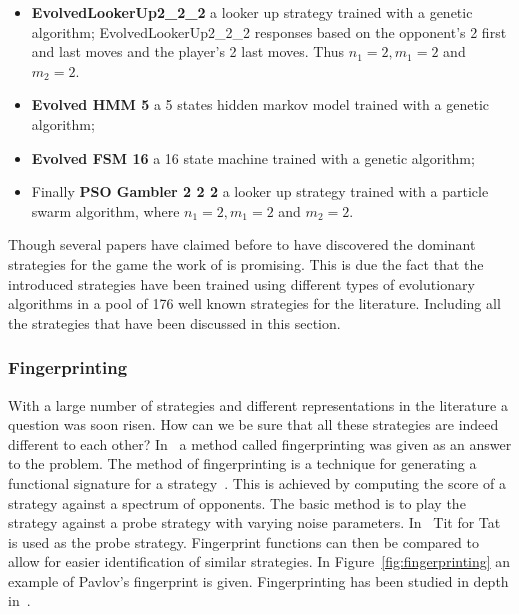 \documentclass{article}
\begin{document}
\begin{itemize}
    \item \textbf{EvolvedLookerUp2\_2\_2} a looker up strategy trained with a
    genetic algorithm; EvolvedLookerUp2\_2\_2 responses based on the opponent's 
    2 first and last moves and the player's 2 last moves. Thus \(n_1=2, m_1=2\)
    and \(m_2=2\). 
    \item \textbf{Evolved HMM 5} a 5 states hidden markov model trained with a genetic 
    algorithm;
    \item \textbf{Evolved FSM 16} a 16 state machine trained with a genetic
    algorithm; 
    \item Finally \textbf{PSO Gambler 2 2 2} a looker up strategy trained with
    a particle swarm algorithm, where \(n_1=2, m_1=2\) and \(m_2=2\).
\end{itemize}

Though several papers have claimed before to have discovered the dominant
strategies for the game the work of \cite{Knight2017} is promising. 
This is due the fact that the introduced strategies have been trained using
different types of evolutionary algorithms in a pool of 176 well known 
strategies for the literature. Including all the strategies that have been 
discussed in this section.

\subsubsection{Fingerprinting}

With a large number of strategies and different representations in the literature
a question was soon risen. How can we be sure that all these strategies are 
indeed different to each other? In~\cite{Ashlock2005} a method called 
fingerprinting was given as an answer to the problem. The method of 
fingerprinting is a technique for generating a functional signature for a 
strategy~\cite{Ashlock2008}. This is achieved by computing the score of a strategy
against a spectrum of opponents. The basic method is to play the strategy
against a probe strategy with varying noise parameters. In~\cite{Ashlock2005} 
Tit for Tat is used as the probe strategy. Fingerprint functions
can then be compared to allow for easier identification of similar strategies.
In Figure~\ref{fig:fingerprinting} an example of Pavlov's fingerprint is given.
Fingerprinting has been studied in depth in~\cite{Ashlock2008, Ashlock2009, 
Ashlock2010, Ashlock2006a}.
\end{document}
